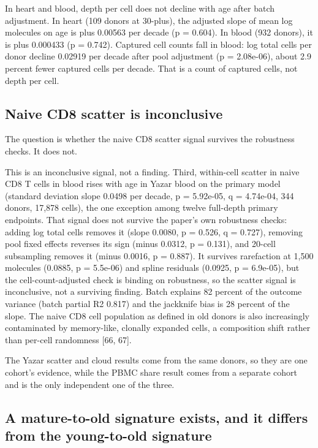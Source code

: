 \documentclass[11pt]{article}
\begin{document}
In heart and blood, depth per cell does not decline with age after batch adjustment. In heart (109 donors at 30-plus), the adjusted slope of mean log molecules on age is plus 0.00563 per decade (p = 0.604). In blood (932 donors), it is plus 0.000433 (p = 0.742). Captured cell counts fall in blood: log total cells per donor decline 0.02919 per decade after pool adjustment (p = 2.08e-06), about 2.9 percent fewer captured cells per decade. That is a count of captured cells, not depth per cell.

\subsection*{Naive CD8 scatter is inconclusive}

The question is whether the naive CD8 scatter signal survives the robustness checks. It does not.

This is an inconclusive signal, not a finding. Third, within-cell scatter in naive CD8 T cells in blood rises with age in Yazar blood on the primary model (standard deviation slope 0.0498 per decade, p = 5.92e-05, q = 4.74e-04, 344 donors, 17,878 cells), the one exception among twelve full-depth primary endpoints. That signal does not survive the paper's own robustness checks: adding log total cells removes it (slope 0.0080, p = 0.526, q = 0.727), removing pool fixed effects reverses its sign (minus 0.0312, p = 0.131), and 20-cell subsampling removes it (minus 0.0016, p = 0.887). It survives rarefaction at 1,500 molecules (0.0885, p = 5.5e-06) and spline residuals (0.0925, p = 6.9e-05), but the cell-count-adjusted check is binding on robustness, so the scatter signal is inconclusive, not a surviving finding. Batch explains 82 percent of the outcome variance (batch partial R2 0.817) and the jackknife bias is 28 percent of the slope. The naive CD8 cell population as defined in old donors is also increasingly contaminated by memory-like, clonally expanded cells, a composition shift rather than per-cell randomness [66, 67].

The Yazar scatter and cloud results come from the same donors, so they are one cohort's evidence, while the PBMC share result comes from a separate cohort and is the only independent one of the three.

\subsection*{A mature-to-old signature exists, and it differs from the young-to-old signature}
\end{document}
